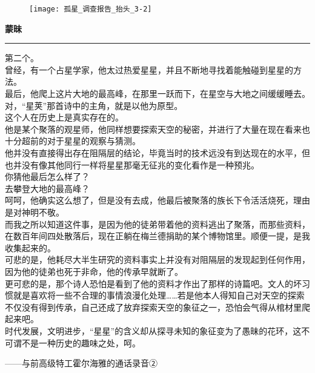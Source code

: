 \documentclass[openany]{book}
\begin{document}
\begin{figure}[h]
    \centering
    \texttt{[image: 孤星\_调查报告\_抬头\_3-2]}
\end{figure}
{\Large\textbf{蒙昧}}\par\noindent\rule{\textwidth}{0.4pt}
第二个。\\
曾经，有一个占星学家，他太过热爱星星，并且不断地寻找着能触碰到星星的方法。\\
最后，他爬上这片大地的最高峰，在那里一跃而下，在星空与大地之间缓缓睡去。\\
对，“星荚”那首诗中的主角，就是以他为原型。\\
这个人在历史上是真实存在的。\\
他是某个聚落的观星师，他同样想要探索天空的秘密，并进行了大量在现在看来也十分超前的对于星星的观察与猜测。\\
他并没有直接得出存在阻隔层的结论，毕竟当时的技术远没有到达现在的水平，但也并没有像其他同行一样将星星那毫无征兆的变化看作是一种预兆。\\
你猜他最后怎么样了？\\
去攀登大地的最高峰？\\
呵呵，他确实这么想了，但是没有去成，他最后被聚落的族长下令活活烧死，理由是对神明不敬。\\
而我之所以知道这件事，是因为他的徒弟带着他的资料逃出了聚落，而那些资料，在数百年间四处散落后，现在正躺在梅兰德捐助的某个博物馆里。顺便一提，是我收集起来的。\\
可悲的是，他耗尽大半生研究的资料事实上并没有对阻隔层的发现起到任何作用，因为他的徒弟也死于非命，他的传承早就断了。\\
更可悲的是，那个诗人恐怕是看到了他的资料才作出了那样的诗篇吧。文人的坏习惯就是喜欢将一些不合理的事情浪漫化处理……若是他本人得知自己对天空的探索不仅没有得到传承，自己还成了放弃探索天空的象征之一，恐怕会气得从棺材里爬起来吧。\\
时代发展，文明进步，“星星”的含义却从探寻未知的象征变为了愚昧的花环，这不可谓不是一种历史的趣味之处，呵。\\
\begin{flushright}——与前高级特工霍尔海雅的通话录音②\end{flushright}
\clearpage
\end{document}
